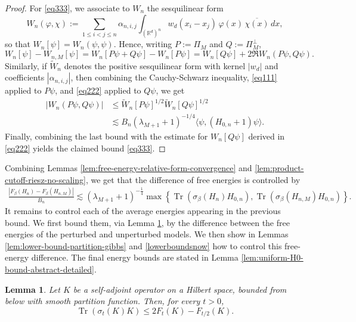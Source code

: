 \documentclass[11pt]{amsart}
\newcommand{\1}{\mathbbm{1}}
\newcommand{\Tr}{\operatorname{Tr}}
\newcommand{\R}{\mathbb{R}}
\theoremstyle{plain}
\newtheorem{lemma}[theorem]{Lemma}
\theoremstyle{definition}
\theoremstyle{remark}
\numberwithin{equation}{section}
\begin{document}
\begin{proof}
For \eqref{eq333}, we associate to \(W_n\) the sesquilinear form
\[
W_n(\varphi,\chi)
:=
\sum_{1\le i<j\le n}
\alpha_{n,i,j}\int_{(\R^d)^n}w_d(x_i-x_j)\,\varphi(x)\,\overline{\chi(x)}\,dx,
\]
so that \(W_n[\psi]=W_n(\psi,\psi)\). Hence, writing \(P:=\Pi_M\) and \(Q:=\Pi_M^\perp\),
\[
W_n[\psi]-W_{n,M}[\psi]
=
W_n[P\psi+Q\psi]-W_n[P\psi]
=
W_n[Q\psi]+2\Re W_n(P\psi,Q\psi).
\]
Similarly, if \(\widetilde W_n\) denotes the positive sesquilinear form with kernel
\(|w_d|\) and coefficients \(|\alpha_{n,i,j}|\), then combining the Cauchy-Schwarz inequality, \eqref{eq111} applied to \(P\psi\), and \eqref{eq222} applied to \(Q\psi\), we get
\begin{align}
|W_n(P\psi,Q\psi)|&\le \widetilde{W}_n[P\psi]^{1/2}\widetilde{W}_n[Q\psi]^{1/2}\nonumber\\
&\lesssim B_n(\lambda_{M+1}+1)^{-1/4}\langle \psi,(H_{0,n}+1)\psi\rangle.\nonumber
\end{align}
Finally, combining the last bound with the estimate for \(W_n[Q\psi]\) derived in \eqref{eq222} yields the claimed bound \eqref{eq333}.
\end{proof}

\noindent \noindent Combining Lemmas \ref{lem:free-energy-relative-form-convergence} and \ref{lem:product-cutoff-riesz-no-scaling}, we get that the difference of free energies is controlled by
\begin{align}\label{almostthereyes}
\frac{|F_\beta(H_n)-F_\beta(H_{n,M})|}{B_n}\lesssim (\lambda_{M+1}+1)^{-\frac{1}{4}} \max \left\{\Tr(\sigma_\beta(H_n)H_{0,n}),\Tr(\sigma_\beta(H_{n,M})H_{0,n})\right\}.
\end{align}
It remains to control each of the average energies appearing in the previous bound. We first bound them, via Lemma \ref{lem:thermodynamic-inequality}, by the difference between the free energies of the perturbed and unperturbed models. We then show in Lemmas \ref{lem:lower-bound-partition-gibbs} and \ref{lowerboundsnow} how to control this free-energy difference. The final energy bounds are stated in Lemma \ref{lem:uniform-H0-bound-abstract-detailed}.

\begin{lemma}
\label{lem:thermodynamic-inequality}
Let \(K\) be a self-adjoint operator on a Hilbert space, bounded from below with smooth partition function. Then, for every \(t>0\),
\begin{equation}
\label{eq:UK-logZ}
\Tr(\sigma_{t}(K)K)\le 2F_t(K)-F_{t/2}(K).
\end{equation}
\end{lemma}
\end{document}
